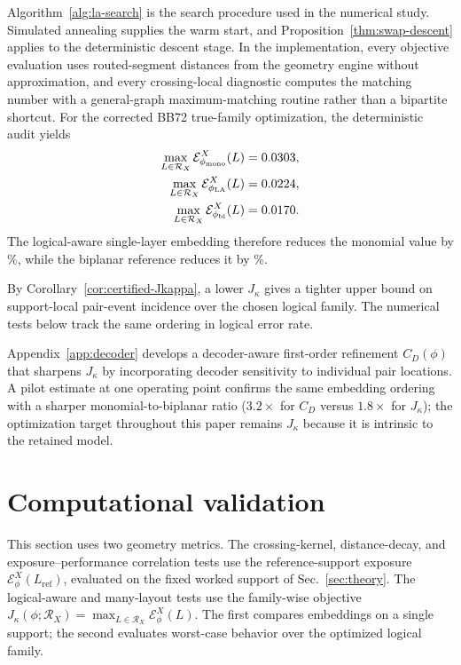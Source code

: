\documentclass[
aps,
prx,
10pt,
twocolumn,
groupedaddress,
longbibliography,
nofootinbib,
floatfix
]{revtex4-2}
\theoremstyle{definition}
\newcommand{\Ew}{\mathcal{E}}
\newcommand{\RX}{\mathcal{R}_X}
\begin{document}
Algorithm~\ref{alg:la-search} is the search procedure used in the numerical study. Simulated annealing supplies the warm start, and Proposition~\ref{thm:swap-descent} applies to the deterministic descent stage. In the implementation, every objective evaluation uses routed-segment distances from the geometry engine without approximation, and every crossing-local diagnostic computes the matching number with a general-graph maximum-matching routine rather than a bipartite shortcut. For the corrected BB72 true-family optimization, the deterministic audit yields
\begin{align}
\max_{L\in\RX}\Ew_{\phi_{\mathrm{mono}}}^{X}(L) & =\bbSeventyTwoLAMaxExposureMono{}, \\
\max_{L\in\RX}\Ew_{\phi_{\mathrm{LA}}}^{X}(L)   & =\bbSeventyTwoLAMaxExposureLA{},   \\
\max_{L\in\RX}\Ew_{\phi_{\mathrm{bi}}}^{X}(L)   & =\bbSeventyTwoLAMaxExposureBi{}.
\end{align}
The logical-aware single-layer embedding therefore reduces the monomial value by \bbSeventyTwoLAImprovementPct\%, while the biplanar reference reduces it by \bbSeventyTwoBiImprovementPct\%.

By Corollary~\ref{cor:certified-Jkappa}, a lower $J_{\kappa}$ gives a tighter upper bound on support-local pair-event incidence over the chosen logical family. The numerical tests below track the same ordering in logical error rate.

Appendix~\ref{app:decoder} develops a decoder-aware first-order refinement $C_D(\phi)$ that sharpens $J_\kappa$ by incorporating decoder sensitivity to individual pair locations. A pilot estimate at one operating point confirms the same embedding ordering with a sharper monomial-to-biplanar ratio ($3.2\times$ for $C_D$ versus $1.8\times$ for $J_\kappa$); the optimization target throughout this paper remains $J_\kappa$ because it is intrinsic to the retained model.

\section{Computational validation}
\label{sec:results}

This section uses two geometry metrics. The crossing-kernel, distance-decay, and exposure--performance correlation tests use the reference-support exposure $\Ew_\phi^X(L_{\mathrm{ref}})$, evaluated on the fixed worked support of Sec.~\ref{sec:theory}. The logical-aware and many-layout tests use the family-wise objective $J_\kappa(\phi;\RX)=\max_{L\in\RX}\Ew_\phi^X(L)$. The first compares embeddings on a single support; the second evaluates worst-case behavior over the optimized logical family.
\end{document}
